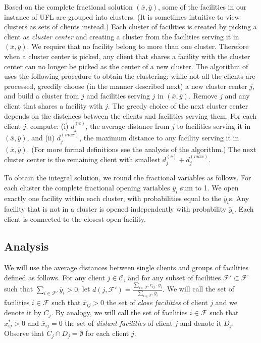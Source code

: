 \documentclass[11pt]{article}
\newcommand{\F}{\mathcal{F}}
\begin{document}
Based on the complete fractional solution $(\overline{x}, \overline{y})$, some of the 
facilities in our instance of UFL are grouped into clusters.
(It is sometimes intuitive to view clusters as sets of clients instead.)
Each cluster of facilities is created by picking a client as {\em cluster center} and
creating a cluster from the facilities serving it in 
$(\overline{x}, \overline{y})$. 
We require that no facility belong to more than one cluster. Therefore when a cluster center is picked, 
any client that shares a facility with the cluster center can no longer be picked as the center of a new cluster.
The algorithm of \cite{DBLP:journals/siamcomp/ChudakS03} uses the following procedure to obtain the
clustering: while not all the clients are processed, greedily choose
(in the manner described next) a new cluster center $j$, and build 
a cluster from $j$
and facilities serving $j$ in $(\overline{x}, \overline{y})$. 
Remove $j$ and any client that shares a facility with $j$.
The greedy choice of the next cluster center depends on the distences between the clients 
and facilities serving them. For each client $j$, compute: 
(i) $d_j^{(c)}$, the average distance from $j$ to facilities serving it 
in $(\overline{x}, \overline{y})$, and (ii) $d_j^{(max)}$,  
the maximum distance to any facility serving it in 
$(\overline{x}, \overline{y})$.
(For more formal definitions see the analysis of the algorithm.)
The next cluster center is the remaining client with smallest $d_j^{(c)} + d_j^{(max)}$.

To obtain the integral solution, we round the fractional variables as follows.
For each cluster the complete fractional opening variables $\overline{y}_i$ sum to 1. We 
open exactly one facility within each cluster, with probabilities equal to the $\overline{y}_i$s.
Any facility that is not in a cluster is opened independently 
with probability $\overline{y}_i$.
Each client is connected to the closest open facility.

\subsection{Analysis}



We will use the average distances between single clients and groups of facilities
defined as follows.
For any client $j \in \mathcal{C}$, and for any subset of facilities $\mathcal{F'} \subset \mathcal{F}$
  such that $\sum_{i \in \mathcal{F'}}{\overline{y}_i} > 0$, let
$
    d(j,\mathcal{F'}) = \frac{\sum_{i \in \mathcal{F'}}{c_{ij} \cdot \overline{y}_i}}
                           {\sum_{i \in \mathcal{F'}}{\overline{y}_i}}.
$ 
We will call the set of facilities $i \in \F$ such that $\overline{x}_{ij} > 0$ the set of \emph{close
facilities} of client $j$ and we denote it by $C_j$. By analogy, we will call the set of facilities $i \in \F$
such that $x^*_{ij} > 0$ and $\overline{x}_{ij} = 0$ the set of \emph{distant facilities} of client $j$ and denote it $D_j$.
Observe that $C_j \cap D_j = \emptyset$ for each client $j$. 
\end{document}
